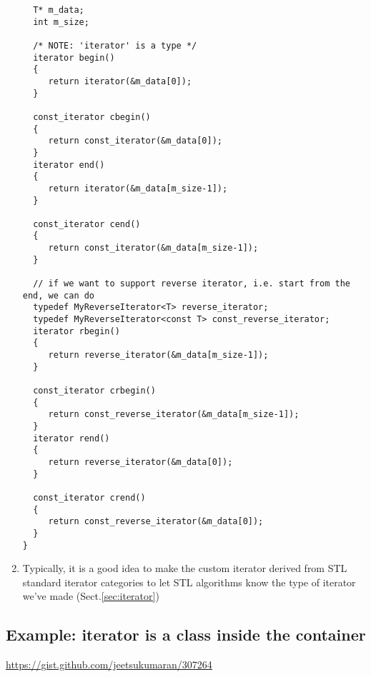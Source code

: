 \begin{enumerate}
\begin{lstlisting}
  T* m_data;
  int m_size;
  
  /* NOTE: 'iterator' is a type */
  iterator begin()
  {
     return iterator(&m_data[0]);
  }
  
  const_iterator cbegin()
  { 
     return const_iterator(&m_data[0]);
  }
  iterator end()
  {
     return iterator(&m_data[m_size-1]);
  }
  
  const_iterator cend()
  { 
     return const_iterator(&m_data[m_size-1]);
  }
  
  // if we want to support reverse iterator, i.e. start from the end, we can do
  typedef MyReverseIterator<T> reverse_iterator;
  typedef MyReverseIterator<const T> const_reverse_iterator;
  iterator rbegin()
  {
     return reverse_iterator(&m_data[m_size-1]);
  }
  
  const_iterator crbegin()
  { 
     return const_reverse_iterator(&m_data[m_size-1]);
  }  
  iterator rend()
  {
     return reverse_iterator(&m_data[0]);
  }
  
  const_iterator crend()
  { 
     return const_reverse_iterator(&m_data[0]);
  }
}
\end{lstlisting}
     
     \item Typically, it is a good idea to make the custom iterator derived from
     STL standard iterator categories to let STL algorithms know the type of
     iterator we've made (Sect.\ref{sec:iterator})
     
     
\end{enumerate}

\subsection{Example: iterator is a class inside the container}

\url{https://gist.github.com/jeetsukumaran/307264}


